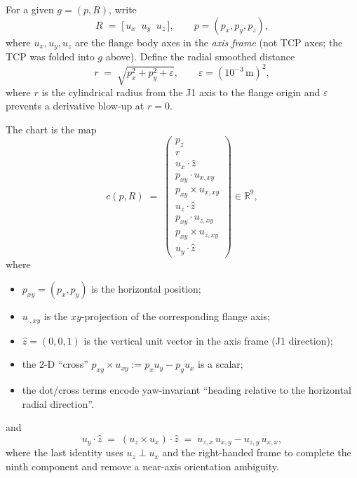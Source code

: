\documentclass[11pt,a4paper]{article}
\newcommand{\R}{\mathbb{R}}
\begin{document}
For a given \(g=(p,R)\), write
\begin{equation}
\label{eq:flange-axes}
  R
  \;=\;
  \bigl[\,u_{x}\;\; u_{y}\;\; u_{z}\,\bigr],
  \qquad
  p=(p_{x},p_{y},p_{z}),
\end{equation}
where \(u_{x},u_{y},u_{z}\) are the flange body axes in the \emph{axis frame}
(not TCP axes; the TCP was folded into \(g\) above). Define the radial
smoothed distance
\begin{equation}
\label{eq:radial}
  r
  \;=\;
  \sqrt{p_{x}^{2}+p_{y}^{2}+\varepsilon},
  \qquad
  \varepsilon=(10^{-3}\,\mathrm{m})^{2},
\end{equation}
where \(r\) is the cylindrical radius from the J1 axis to the flange origin
and \(\varepsilon\) prevents a derivative blow-up at \(r=0\).

The chart is the map
\begin{equation}
\label{eq:chart}
  c(p,R)
  \;=\;
  \begin{pmatrix}
    p_{z}\\
    r\\
    u_{x}\!\cdot\!\hat z\\
    p_{xy}\!\cdot\! u_{x,xy}\\
    p_{xy}\!\times\! u_{x,xy}\\
    u_{z}\!\cdot\!\hat z\\
    p_{xy}\!\cdot\! u_{z,xy}\\
    p_{xy}\!\times\! u_{z,xy}\\
    u_{y}\!\cdot\!\hat z
  \end{pmatrix}
  \in\R^{9},
\end{equation}
where
\begin{itemize}[leftmargin=1.4em]
  \item \(p_{xy}=(p_{x},p_{y})\) is the horizontal position;
  \item \(u_{\cdot,xy}\) is the \(xy\)-projection of the corresponding flange
        axis;
  \item \(\hat z=(0,0,1)\) is the vertical unit vector in the axis frame
        (J1 direction);
  \item the 2-D ``cross'' \(p_{xy}\times u_{xy}:=p_{x}u_{y}-p_{y}u_{x}\) is a
        scalar;
  \item the dot/cross terms encode yaw-invariant ``heading relative to the
        horizontal radial direction''.
\end{itemize}
and
\begin{equation}
\label{eq:uyz}
  u_{y}\!\cdot\!\hat z
  \;=\;
  (u_{z}\times u_{x})\!\cdot\!\hat z
  \;=\;
  u_{z,x}\,u_{x,y}-u_{z,y}\,u_{x,x},
\end{equation}
where the last identity uses \(u_{z}\perp u_{x}\) and the right-handed frame
to complete the ninth component and remove a near-axis orientation ambiguity.
\end{document}
